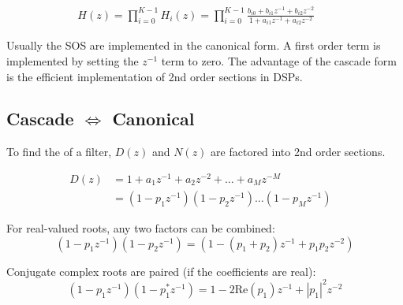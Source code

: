 \begin{align*}
	H(z) = \prod_{i=0}^{K-1}H_i(z) = \prod_{i=0}^{K-1}\frac
	{b_{i0}+b_{i1}z^{-1}+b_{i2}z^{-2}}
	{1+a_{i1}z^{-1}+a_{i2}z^{-2}} &&
\end{align*}

Usually the SOS are implemented in the canonical form. A first order term is
implemented by setting the $z^{-1}$ term to zero. The advantage of the cascade
form is the efficient implementation of 2nd order sections in DSPs.

\subsection{Cascade $\Leftrightarrow$ Canonical}
To find the  of a filter, $D(z)$ and $N(z)$ are
factored into 2nd order sections. 

\begin{align*}
D(z) &= 1 + a_1 z^{-1} + a_2 z^{-2} + \dots + a_M z^{-M} &\\
&=(1-p_1z^{-1})(1-p_2z^{-1}) \dots (1-p_Mz^{-1})&
\end{align*}

For real-valued roots, any two factors can be combined:
\begin{equation*}
	(1 - p_1 z^{-1}) (1 - p_2 z^{-1}) = (1 - (p_1 + p_2) z^{-1} + p_1 p_2 z^{-2})
\end{equation*}

Conjugate complex roots are paired (if the coefficients are real):
\begin{equation*}
	(1 - p_1 z^{-1}) (1 - p_1^* z^{-1}) = 1 - 2 \text{Re}(p_1) z^{-1} + |p_1|^2 z^{-2}
\end{equation*}
